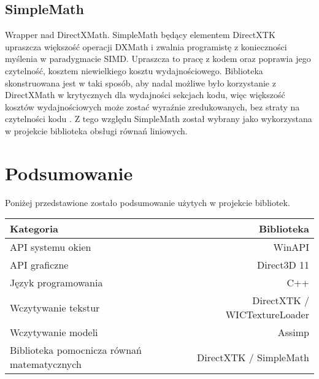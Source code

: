 \subsection{SimpleMath}

Wrapper nad DirectXMath. SimpleMath będący elementem DirectXTK upraszcza
większość operacji DXMath i zwalnia programistę z konieczności myślenia
w paradygmacie SIMD. Upraszcza to pracę z kodem oraz poprawia jego
czytelność, kosztem niewielkiego kosztu wydajnościowego. Biblioteka
skonstruowana jest w taki sposób, aby nadal możliwe było korzystanie z
DirectXMath w krytycznych dla wydajności sekcjach kodu, więc większość
kosztów wydajnościowych może zostać wyraźnie zredukowanych, bez straty
na czytelności kodu \cite{github:directxtk:simplemath:2024}. Z tego względu SimpleMath został wybrany
jako wykorzystana w projekcie biblioteka obsługi równań liniowych.

\section{Podsumowanie}

Poniżej przedstawione zostało podsumowanie użytych w projekcie
bibliotek.



\begin{center}
	\begin{tabular}{ |l r| }
		\hline
		\textbf{Kategoria} & \textbf{Biblioteka} \\
		\hline
		API systemu okien & WinAPI \\
		API graficzne & Direct3D 11 \\
		Język programowania & C++ \\ 
		Wczytywanie tekstur & DirectXTK / WICTextureLoader \\
		Wczytywanie modeli & Assimp \\
		Biblioteka pomocnicza równań matematycznych & DirectXTK / SimpleMath \\
		\hline
	\end{tabular}
\end{center}